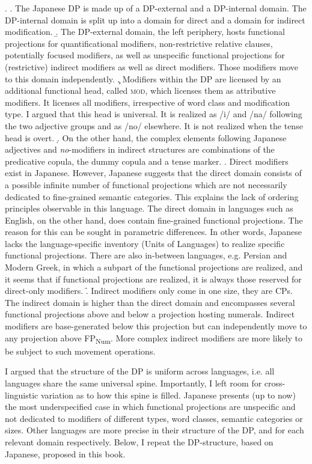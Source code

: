 \documentclass [output=book,colorlinks,citecolor=brown]{langscibook}
\begin{document}
\ex. \a. The Japanese DP is made up of a DP-external and a DP-internal domain. The DP-internal domain is split up into a domain for direct and a domain for indirect modification.
\b. The DP-external domain, the left periphery, hosts functional projections for quantificational modifiers, non-restrictive relative clauses, potentially focused modifiers, as well as unspecific functional projections for (restrictive) indirect modifiers as well as direct modifiers. Those modifiers move to this domain independently.
\c. Modifiers within the DP are licensed by an additional functional head, called \textsc{mod}, which licenses them as attributive modifiers. It licenses all modifiers, irrespective of word class and modification type. I argued that this head is universal. It is realized as /i/ and /na/ following the two adjective groups and as /no/ elsewhere. It is not realized when the tense head is overt.
\d. On the other hand, the complex elements following Japanese adjectives and \textit{no}-modifiers in indirect structures are combinations of the predicative copula, the dummy copula and a tense marker.
\e. Direct modifiers exist in Japanese. However, Japanese suggests that the direct domain consists of a possible infinite number of functional projections which are not necessarily dedicated to fine-grained semantic categories. This explains the lack of ordering principles observable in this language. The direct domain in languages such as English, on the other hand, does contain fine-grained functional projections. The reason for this can be sought in parametric differences. In other words, Japanese lacks the language-specific inventory (Units of Languages) to realize specific functional projections. There are also in-between languages, e.g. Persian and Modern Greek, in which a subpart of the functional projections are realized, and it seems that if functional projections are realized, it is always those reserved for direct-only modifiers.
\f. Indirect modifiers only come in one size, they are CPs. The indirect domain is higher than the direct domain and encompasses several functional projections above and below a projection hosting numerals. Indirect modifiers are base-generated below this projection but can independently move to any projection above FP\textsubscript{Num}. More complex indirect modifiers are more likely to be subject to such movement operations.

I argued that the structure of the DP is uniform across languages, i.e. all languages share the same universal spine. Importantly, I left room for cross-linguistic variation as to how this spine is filled. Japanese presents (up to now) the most underspecified case in which functional projections are unspecific and not dedicated to modifiers of different types, word classes, semantic categories or sizes. Other languages are more precise in their structure of the DP, and for each relevant domain respectively. Below, I repeat the DP-structure, based on Japanese, proposed in this book.
\end{document}
